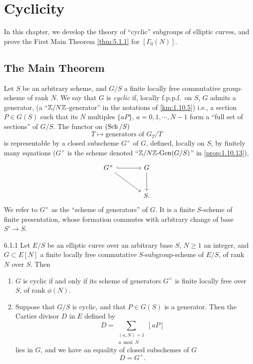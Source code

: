 \chapter{Cyclicity}
\label{ch:6}

In this chapter, we develop the theory of ``cyclic'' subgroups of elliptic curves, and prove the First Main Theorem \ref{thm:5.1.1} for $[\Gamma_0(N)]$.

\section{The Main Theorem}
\label{sec:6.1}

Let $S$ be an arbitrary scheme, and $G/S$ a finite locally free commutative group-scheme of rank $N$. We say that $G$ is \emph{cyclic} if, locally f.p.p.f.\ on $S$, $G$ admits a generator, (a ``$\mathbb{Z}/N\mathbb{Z}$-generator'' in the notations of \ref{km:1.10.5}) i.e., a section $P \in G(S)$ such that its $N$ multiples $\{aP\}$, $a = 0,1,\cdots,N-1$ form a ``full set of sections'' of $G/S$. The functor on $(\operatorname{Sch}/S)$
\[
T \longmapsto \text{generators of } G_T/T
\]
is representable by a closed subscheme $G^\times$ of $G$, defined, locally on $S$, by finitely many equations ($G^\times$ is the scheme denoted ``$\mathbb{Z}/N\mathbb{Z}\text{-Gen}(G/S)$'' in \ref{prop:1.10.13}),
\[
\begin{tikzcd}[column sep=large, row sep=large]
G^\times \arrow[r, hook] \arrow[rd] & G \arrow[d] \\
& S .
\end{tikzcd}
\]
We refer to $G^\times$ as the ``scheme of generators'' of $G$. It is a finite $S$-scheme of finite presentation, whose formation commutes with arbitrary change of base $S' \to S$.

\begin{mtcg}{6.1.1}\label{thm:6.1.1}
Let $E/S$ be an elliptic curve over an arbitrary base $S$, $N \ge 1$ an integer, and $G \subset E[N]$ a finite locally free commutative $S$-subgroup-scheme of $E/S$, of rank $N$ over $S$. Then
\begin{enumerate}[(1)]
\item $G$ is cyclic if and only if its scheme of generators $G^\times$ is finite locally free over $S$, of rank $\phi(N)$.
\item Suppose that $G/S$ is cyclic, and that $P \in G(S)$ is a generator. Then the Cartier divisor $D$ in $E$ defined by
\[
D = \sum_{\substack{(a,N)=1 \\ a \bmod N}} [aP]
\]
lies in $G$, and we have an equality of closed subschemes of $G$
\[
D = G^\times .
\]
\end{enumerate}
\end{mtcg}

